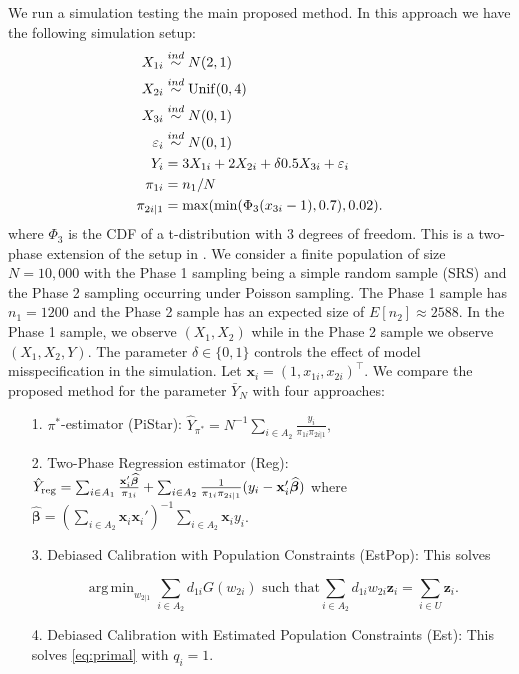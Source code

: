 \documentclass[12pt]{article}
\DeclareMathOperator*{\argmin}{arg\,min}
\renewcommand{\bf}[1]{\mathbf{#1}}
\begin{document}
We run a simulation testing the main proposed method. In this approach we have the
following simulation setup:
$$
\begin{aligned}
X_{1i} &\stackrel{ind}{\sim} N(2, 1) \\
X_{2i} &\stackrel{ind}{\sim} \rm{Unif}(0, 4) \\
X_{3i} &\stackrel{ind}{\sim} N(0, 1) \\
\varepsilon_i &\stackrel{ind}{\sim} N(0, 1) \\
Y_{i} &= 3 X_{1i} + 2 X_{2i} + \delta 0.5 X_{3i} + \varepsilon_i \\
\pi_{1i} &= n_1 / N \\
\pi_{2i|1} &= \max(\min(\Phi_3(x_{3i} - 1), 0.7), 0.02).
\end{aligned}
$$
where $\Phi_3$ is the CDF of a t-distribution with 3 degrees of freedom.
This is a two-phase extension of the setup in \cite{kwon2024debiased}. We
consider a finite population of size $N = 10,000$ with the Phase 1 sampling
being a simple random sample (SRS) and the 
Phase 2 sampling occurring under Poisson sampling. The Phase 1 sample has
$n_1 = 1200$ and the Phase 2 sample has an expected size of
$E[n_2] \approx 2588$. In the Phase 1 sample, we observe 
$(X_1, X_2)$ while in the Phase 2 sample we observe $(X_1, X_2, Y)$. 
The parameter $\delta \in \{0, 1\}$ controls the effect of model misspecification
in the simulation. Let $\bf x_i = (1, x_{1i}, x_{2i})^\top$. We compare the
proposed method for the parameter $\bar Y_N$ with four approaches:

\begin{itemize}
  \item[1.] $\pi^*$-estimator (PiStar): $\hat Y_{\pi^*} = N^{-1} \sum_{i \in A_2}
    \frac{y_i}{\pi_{1i} \pi_{2i|1}},$
  \item[2.] Two-Phase Regression estimator (Reg): 
    $\hat Y_{\rm reg} = 
    \sum_{i \in A_1} \frac{\bf x_i' \widehat{\bm \beta}}{\pi_{1i}} + 
    \sum_{i \in A_2} \frac{1}{\pi_{1i}\pi_{2i|1}}(y_i - \bf x_i' \widehat{\bm \beta})$ 
    where $\widehat{\bm \beta} = 
    \left(\sum_{i \in A_2} \bf x_i \bf x_i'\right)^{-1} \sum_{i \in A_2} \bf x_i y_i$.
  \item[3.] Debiased Calibration with Population Constraints (EstPop): This 
    solves 

  \begin{equation}
    \argmin_{w_{2|1}} \sum_{i \in A_2} d_{1i} G(w_{2i}) \text{ such that}
    \sum_{i \in A_2} d_{1i} w_{2i} \bf z_i = \sum_{i \in U} \bf z_i.
  \end{equation}

  \item[4.] Debiased Calibration with Estimated Population Constraints (Est):
    This solves \eqref{eq:primal} with $q_i = 1$.
\end{itemize}
\end{document}
